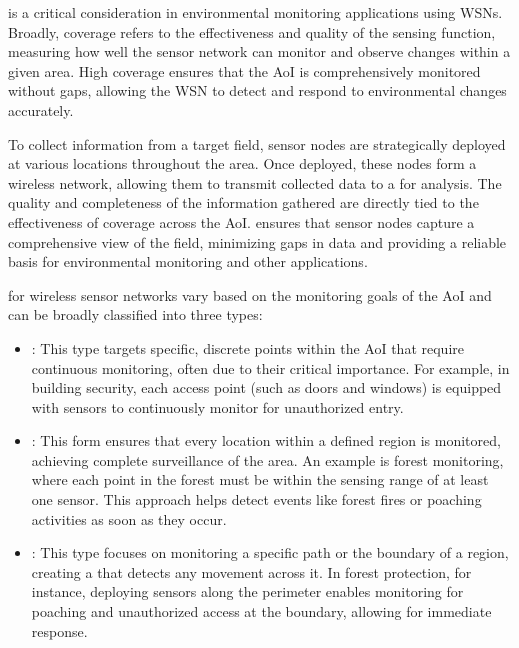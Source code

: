 \documentclass[a4paper, 12pt]{report}
\begin{document}
     is a critical consideration in environmental monitoring applications using WSNs. Broadly, coverage refers to the effectiveness and quality of the sensing function, measuring how well the sensor network can monitor and observe changes within a given area. High coverage ensures that the AoI is comprehensively monitored without gaps, allowing the WSN to detect and respond to environmental changes accurately.

    To collect information from a target field, sensor nodes are strategically deployed at various locations throughout the area. Once deployed, these nodes form a wireless network, allowing them to transmit collected data to a  for analysis. The quality and completeness of the information gathered are directly tied to the effectiveness of coverage across the AoI.  ensures that sensor nodes capture a comprehensive view of the field, minimizing gaps in data and providing a reliable basis for environmental monitoring and other applications.

     for wireless sensor networks vary based on the monitoring goals of the AoI and can be broadly classified into three types:

    \begin{itemize}
        \item {}: This type targets specific, discrete points within the AoI that require continuous monitoring, often due to their critical importance. For example, in building security, each access point (such as doors and windows) is equipped with sensors to continuously monitor for unauthorized entry.
        \item {}: This form ensures that every location within a defined region is monitored, achieving complete surveillance of the area. An example is forest monitoring, where each point in the forest must be within the sensing range of at least one sensor. This approach helps detect events like forest fires or poaching activities as soon as they occur.
        \item {}: This type focuses on monitoring a specific path or the boundary of a region, creating a  that detects any movement across it. In forest protection, for instance, deploying sensors along the perimeter enables monitoring for poaching and unauthorized access at the boundary, allowing for immediate response.
    \end{itemize}
\end{document}
